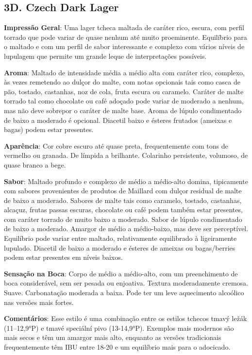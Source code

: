 \subsection*{3D. Czech Dark Lager}
\textbf{Impressão Geral}: Uma lager tcheca maltada de caráter rico, escura, com perfil torrado que pode variar de quase nenhum até muito proeminente. Equilíbrio para o maltado e com um perfil de sabor interessante e complexo com vários níveis de lupulagem que permite um grande leque de interpretações possíveis.

\textbf{Aroma}: Maltado de intensidade média a médio alta com caráter rico, complexo, às vezes remetendo ao dulçor do malte, com notas opcionais tais como casca de pão, tostado, castanhas, noz de cola, fruta escura ou caramelo. Caráter de malte torrado tal como chocolate ou café adoçado pode variar de moderado a nenhum, mas não deve sobrepor o caráter de malte base. Aroma de lúpulo condimentado de baixo a moderado é opcional. Diacetil baixo e ésteres frutados (ameixas e bagas) podem estar presentes.

\textbf{Aparência}: Cor cobre escuro até quase preta, frequentemente com tons de vermelho ou granada. De límpida a brilhante. Colarinho persistente, volumoso, de quase branco a bege.

\textbf{Sabor}: Maltado profundo e complexo de médio a médio-alto domina, tipicamente com sabores provenientes de produtos de Maillard com dulçor residual de malte de baixo a moderado. Sabores de malte tais como caramelo, tostado, castanhas, alcaçuz, frutas passas escuras, chocolate ou café podem também estar presentes, com caráter torrado de muito baixo a moderado. Sabor de lúpulo condimentado de baixo a moderado. Amargor de médio a médio-baixo, mas deve ser perceptível. Equilíbrio pode variar entre maltado, relativamente equilibrado à ligeiramente lupulado. Diacetil de baixo a moderado e ésteres de ameixas ou bagas/berries podem estar presentes em níveis baixos.

\textbf{Sensação na Boca}: Corpo de médio a médio-alto, com um preenchimento de boca considerável, sem ser pesada ou enjoativa. Textura moderadamente cremosa. Suave. Carbonatação moderada a baixa. Pode ter um leve aquecimento alcoólico nas versões mais fortes.

\textbf{Comentários}: Esse estilo é uma combinação entre os estilos tchecos tmavý ležák (11–12,9°P) e tmavé speciální pivo (13-14,9°P). Exemplos mais modernos são mais secos e têm um amargor mais alto, enquanto as versões tradicionais frequentemente têm IBU entre 18-20 e um equilíbrio mais para o adocicado.

